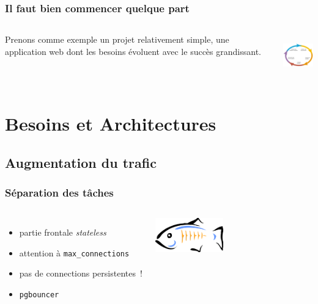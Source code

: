\documentclass[english]{beamer}
\begin{document}
\begin{frame}[fragile]
  \frametitle{Il faut bien commencer quelque part}

  \linebreak

\begin{columns}[c]

  Prenons comme exemple un projet relativement simple, une application web
  dont les besoins évoluent avec le succès grandissant.


\includegraphics[height=5em]{development_life_cycle.png}
\end{columns}
\end{frame}

\section{Besoins et Architectures}

\subsection{Augmentation du trafic}

\begin{frame}[fragile]
  \frametitle{Séparation des tâches}

  \linebreak
  \linebreak

\begin{columns}[c]

  \begin{itemize}
   \item<1-> partie frontale \textit{stateless}
   \item<2-> attention à \texttt{max\_connections}
   \item<2-> pas de connections persistentes !
   \item<3-> \texttt{pgbouncer}
  \end{itemize}  

\includegraphics[height=4em]{bouncer.png}
\end{columns}
\end{frame}
\end{document}
